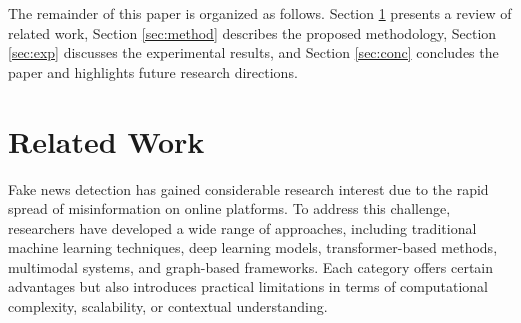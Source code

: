 \documentclass[conference]{IEEEtran}
\begin{document}
The remainder of this paper is organized as follows. Section \ref{sec:lit} presents a review of related work, Section \ref{sec:method} describes the proposed methodology, Section \ref{sec:exp} discusses the experimental results, and Section \ref{sec:conc} concludes the paper and highlights future research directions.

\section{Related Work}
\label{sec:lit}

Fake news detection has gained considerable research interest due to the rapid spread of misinformation on online platforms. To address this challenge, researchers have developed a wide range of approaches, including traditional machine learning techniques, deep learning models, transformer-based methods, multimodal systems, and graph-based frameworks. Each category offers certain advantages but also introduces practical limitations in terms of computational complexity, scalability, or contextual understanding.
\end{document}
